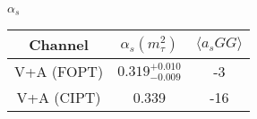 \documentclass{article}
\begin{document}
  $\alpha_s$
  \begin{center}
    \begin{tabular}{| c | c | c |}
      \hline
      Channel & $\alpha_s(m_\tau^2)$ & $\langle a_sGG \rangle$ \\ 
      \hline
      V+A (FOPT) & $0.319^{+0.010}_{-0.009}$ & -3 \\  
      \hline
      V+A (CIPT) & 0.339 & -16 \\    
      \hline
    \end{tabular}
  \end{center}
  
\end{document}
